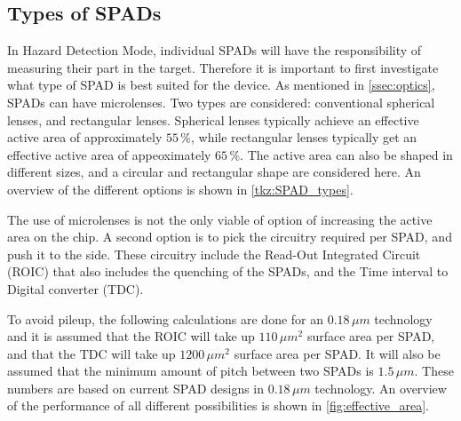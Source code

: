 \subsection{Types of SPADs}\label{ssec:SPADs}
In Hazard Detection Mode, individual SPADs will have the responsibility of measuring their part in the target. Therefore it is important to first investigate what type of SPAD is best suited for the device. As mentioned in \cref{ssec:optics}, SPADs can have microlenses. Two types are considered: conventional spherical lenses, and rectangular lenses. Spherical lenses typically achieve an effective active area of approximately $55\,\%$, while rectangular lenses typically get an effective active area of appeoximately $65\,\%$. The active area can also be shaped in different sizes, and a circular and rectangular shape are considered here. An overview of the different options is shown in \cref{tkz:SPAD_types}.




The use of microlenses is not the only viable of option of increasing the active area on the chip. A second option is to pick the circuitry required per SPAD, and push it to the side. These circuitry include the Read-Out Integrated Circuit (ROIC) that also includes the quenching of the SPADs, and the Time interval to Digital converter (TDC). 

To avoid pileup, the following calculations are done for an $0.18\,\mu m$ technology and it is assumed that the ROIC will take up $110\,\mu m^2$ surface area per SPAD, and that the TDC will take up $1200\,\mu m^2$ surface area per SPAD. It will also be assumed that the minimum amount of pitch between two SPADs is $1.5\,\mu m$. These numbers are based on current SPAD designs in $0.18\,\mu m$ technology. An overview of the performance of all different possibilities is shown in \cref{fig:effective_area}.


